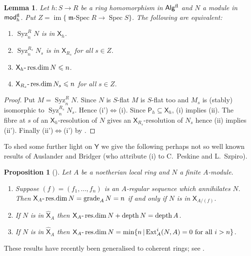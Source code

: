 \documentclass[a4paper,10pt]{amsart}
\theoremstyle{plain}
\newtheorem{prop}[xx]{Proposition}%
\newtheorem{lem}[xx]{Lemma}%
\theoremstyle{definition}
\theoremstyle{remark}
\numberwithin{equation}{xx}
\DeclareMathOperator{\depth}{depth}
\DeclareMathOperator{\Ext}{Ext}
\DeclareMathOperator{\grade}{grade}
\DeclareMathOperator{\im}{im}
\DeclareMathOperator{\mSpec}{\fr{m}-Spec}
\DeclareMathOperator{\Resdim}{res{.}dim}
\DeclareMathOperator{\Spec}{Spec}
\DeclareMathOperator{\Syz}{Syz}
\newcommand{\co}{\colon}
\newcommand{\ra}{\rightarrow}
\newcommand{\lRa}{\Leftrightarrow}
\newcommand{\sbeq}{\subseteq}
\newcommand{\Algf}{\cat{Alg}{}^{\textnormal{fl}}}
\newcommand{\modf}{\cat{mod}{}^{\textnormal{fl}}}
\newcommand{\resdim}[2]{{#1}\textnormal{-}\Resdim{#2}}
\renewcommand{\leq}{\leqslant}
\newcommand{\cat}[1]{\mathsf{{#1}}}
\newcommand{\fr}[1]{\mathfrak{{#1}}}
\newcommand{\xt}[4]{{\Ext} _{#2}^{#1}({#3},{#4})}
\newcommand{\syz}[2]{{\Syz}_{#2}^{#1}}
\begin{document}
\begin{lem}\label{lem.Gordim}
Let \(h\co S\ra R\) be a ring homomorphism in \(\Algf\) and \(N\) a module in \(\modf_{h}\)\textup{.} Put \(Z=\im\{\mSpec R\ra\Spec S\}\)\textup{.} The following are equivalent\textup{:}
\begin{enumerate}
\item[(i)] \(\syz{R}{n}N\) is in \(\cat{X}_{h}\)\textup{.}
\item[(i')] \(\syz{R_{s}}{n}N_{s}\) is in \(\cat{X}_{R_{s}}\) for all \(s\in Z\)\textup{.}
\item[(ii)] \(\resdim{\cat{X}_{h}}{N}\leq n\)\textup{.}
\item[(ii')] \(\resdim{\cat{X}_{R_{s}}}{N_{s}}\leq n\) for all \(s\in Z\)\textup{.}
\end{enumerate}
\end{lem}
\begin{proof}
Put \(M=\syz{R}{n}N\). Since \(N\) is \(S\)-flat \(M\) is \(S\)-flat too and \(M_{s}\) is (stably) isomorphic to \(\syz{R_{s}}{n}N_{s}\). Hence (i')\(\lRa\)(i). Since \(\cat{P}_{h}\sbeq\cat{X}_{h}\), (i) implies (ii). The fibre at \(s\) of an \(\cat{X}_{h}\)-resolution of \(N\) gives an \(\cat{X}_{R_{s}}\)-resolution of \(N_{s}\) hence (ii) implies (ii'). Finally (ii')\(\lRa\)(i') by \cite[3.13]{aus/bri:69}.
\end{proof}
To shed some further light on \(\cat{Y}\) we give the following perhaps not so well known results of Auslander and Bridger (who attribute (i) to C.\ Peskine and L.\ Szpiro).
\begin{prop}[{\cite[4.12, 13, 35]{aus/bri:69}}]\label{prop.ausbri}
Let \(A\) be a noetherian local ring and \(N\) a finite \(A\)-module\textup{.}
\begin{enumerate}
\item[(i)] Suppose \((f)=(f_{1},\dots,f_{n})\) is an \(A\)-regular sequence which annihilates \(N\)\textup{.} Then \(\resdim{\cat{X}_{A}}{N}=\grade_{A} N=n\) if and only if \(N\) is in \(\cat{X}_{A/(f)}\)\textup{.}

\item[(ii)] If \(N\) is in \(\cat{\hat{X}}_{A}\) then \(\resdim{\cat{X}_{A}}{N}+\depth N=\depth A\)\textup{.}

\item[(iii)] If \(N\) is in \(\cat{\hat{X}}_{A}\) then \(\resdim{\cat{X}_{A}}{N}=\min\{n\,\vert\, \xt{i}{A}{N}{A}=0\text{ for all }i>n\}\)\textup{.}
\end{enumerate}
\end{prop}
These results have recently been generalised to coherent rings; see \cite{hum/mar:09}.
\end{document}

